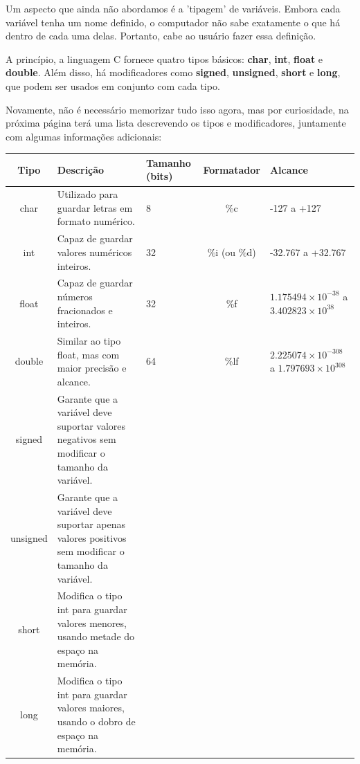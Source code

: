 Um aspecto que ainda não abordamos é a 'tipagem' de variáveis. Embora cada 
variável tenha um nome definido, o computador não sabe exatamente o que há 
dentro de cada uma delas. Portanto, cabe ao usuário fazer essa definição.

A princípio, a linguagem C fornece quatro tipos básicos: \textbf{char}, 
\textbf{int}, \textbf{float} e \textbf{double}. Além disso, há modificadores 
como \textbf{signed}, \textbf{unsigned}, \textbf{short} e \textbf{long}, que 
podem ser usados em conjunto com cada tipo.

Novamente, não é necessário memorizar tudo isso agora, mas por curiosidade, na 
próxima página terá uma lista descrevendo os tipos e modificadores, juntamente 
com algumas informações adicionais:

\newpage

\begin{center}
    \centering
    \begin{tabular}{|c|p{4cm}|p{2cm}|c|p{4cm}|}
        \hline
        \textbf{Tipo} & \textbf{Descrição} & \textbf{Tamanho (bits)} & \textbf{Formatador} & \textbf{Alcance} \\
        \hline
        char & Utilizado para guardar letras em formato numérico. & 8 & \%c & -127 a +127 \\
        \hline
        int & Capaz de guardar valores numéricos inteiros. & 32 & \%i (ou \%d) & -32.767 a +32.767 \\
        \hline
        float & Capaz de guardar números fracionados e inteiros. & 32 & \%f & \(1.175494 \times 10^{-38}\) a \(3.402823 \times 10^{38}\) \\
        \hline
        double & Similar ao tipo float, mas com maior precisão e alcance. & 64 & \%lf & \(2.225074 \times 10^{-308}\) a \(1.797693 \times 10^{308}\) \\
        \hline
        signed & Garante que a variável deve suportar valores negativos sem modificar o tamanho da variável. & & & \\
        \hline
        unsigned & Garante que a variável deve suportar apenas valores positivos sem modificar o tamanho da variável. & & & \\
        \hline
        short & Modifica o tipo int para guardar valores menores, usando metade do espaço na memória. & & & \\
        \hline
        long & Modifica o tipo int para guardar valores maiores, usando o dobro de espaço na memória. & & & \\
        \hline
    \end{tabular}
\end{center}

